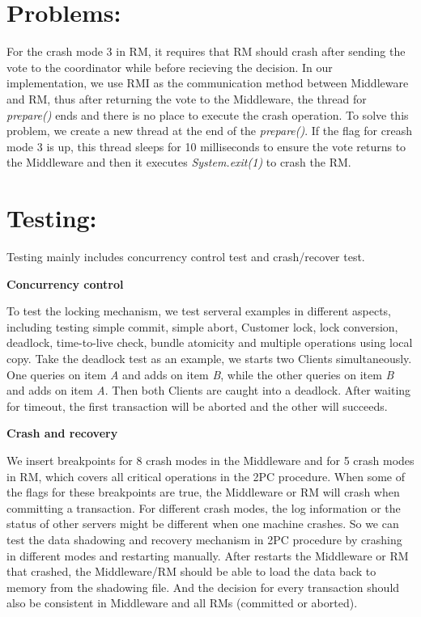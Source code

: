 \documentclass[a4paper, 12pt]{article}
\newcommand{\newQuestion}[1]{\section{#1}}
\newcommand{\newPart}[1]{\textbf{\large #1}}
\begin{document}
\newQuestion{Problems:}

For the crash mode 3 in RM, it requires that RM should crash after sending the vote to the coordinator while before recieving the decision. In our implementation, we use RMI as the communication method between Middleware and RM, thus after returning the vote to the Middleware, the thread for \textit{prepare()} ends and there is no place to execute the crash operation. To solve this problem, we create a new thread at the end of the \textit{prepare()}. If the flag for creash mode 3 is up, this thread sleeps for 10 milliseconds to ensure the vote returns to the Middleware and then it executes \textit{System.exit(1)} to crash the RM.

\newQuestion{Testing:}

Testing mainly includes concurrency control test and crash/recover test.

\newPart{Concurrency control}

To test the locking mechanism, we test serveral examples in different aspects, including testing simple commit, simple abort, Customer lock, lock conversion, deadlock, time-to-live check, bundle atomicity and multiple operations using local copy. Take the deadlock test as an example, we starts two Clients simultaneously. One queries on item \textit{A} and adds on item \textit{B}, while the other queries on item \textit{B} and adds on item \textit{A}. Then both Clients are caught into a deadlock. After waiting for timeout, the first transaction will be aborted and the other will succeeds.

\newPart{Crash and recovery}

We insert breakpoints for 8 crash modes in the Middleware and for 5 crash modes in RM, which covers all critical operations in the 2PC procedure. When some of the flags for these breakpoints are true, the Middleware or RM will crash when committing a transaction. For different crash modes, the log information or the status of other servers might be different when one machine crashes. So we can test the data shadowing and recovery mechanism in 2PC procedure by crashing in different modes and restarting manually. After restarts the Middleware or RM that crashed, the Middleware/RM should be able to load the data back to memory from the shadowing file. And the decision for every transaction should also be consistent in Middleware and all RMs (committed or aborted).

\end{document}
